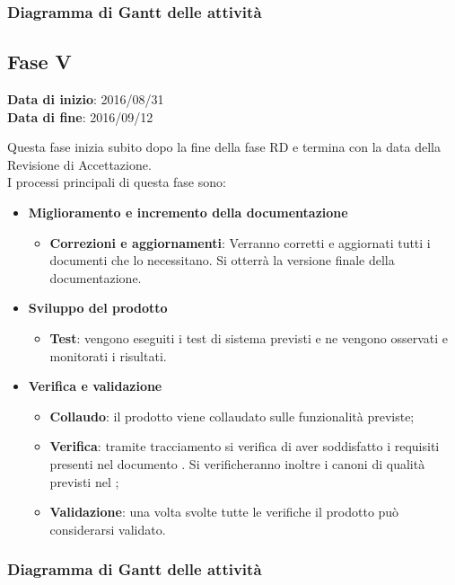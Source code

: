 		\subsubsection{Diagramma di Gantt delle attività}
		
	\subsection{Fase V}
	\begin{center}
		\textbf{Data di inizio}: 2016/08/31 \\
		\textbf{Data di fine}: 2016/09/12 \\
	\end{center}
	Questa fase inizia subito dopo la fine della fase RD e termina con la data della Revisione di Accettazione. \\
	I processi principali di questa fase sono:
		\begin{itemize}
			\item \textbf{Miglioramento e incremento della documentazione}
			\att
			\begin{itemize}
				\item \textbf{Correzioni e aggiornamenti}: Verranno corretti e aggiornati tutti i documenti che lo necessitano. Si otterrà la versione finale della documentazione. 
			\end{itemize}
			\item \textbf{Sviluppo del prodotto}
			\att
				\begin{itemize}
					\item \textbf{Test}: vengono eseguiti i test di sistema previsti e ne vengono osservati e monitorati i risultati. 
				\end{itemize}
			\item \textbf{Verifica e validazione}
			\att
			\begin{itemize}
				\item \textbf{Collaudo}: il prodotto viene collaudato sulle funzionalità previste;
				\item \textbf{Verifica}: tramite tracciamento si verifica di aver soddisfatto i requisiti presenti nel documento \ARdoc. Si verificheranno inoltre i canoni di qualità previsti nel \PQdoc;
				\item \textbf{Validazione}: una volta svolte tutte le verifiche il prodotto può considerarsi validato.
			\end{itemize}
		\end{itemize}
		\subsubsection{Diagramma di Gantt delle attività}
	

